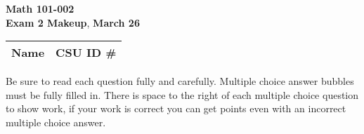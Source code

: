 \documentclass[12pt]{exam}
\newcommand{\class}{Math 101-002} %
\newcommand{\examnum}{Exam 2 Makeup} %
\newcommand{\examdate}{March 26} %
\begin{document}
\pagestyle{plain}
\thispagestyle{empty}

\noindent
\textbf{\class}\\
\textbf{\examnum}, \textbf{\examdate} \\



\setlength{\tabcolsep}{3.5cm} %
\renewcommand{\arraystretch}{1.5}
\setlength\extrarowheight{1cm}
\begin{tabular}{ |c|c| } 
 \hline
 Name   & CSU ID \#  \\ 
 \hline
\end{tabular}
\vspace{10pt}

Be sure to read each question fully and carefully. Multiple choice answer bubbles must be fully filled in.  There is space to the right of each multiple choice question to show work, if your work is correct you can get points even with an incorrect multiple choice answer.  


\iffalse

    \foreach \s in {1,...,5}{
          \choice $P_\s$ has no power 
     }%
\fi
\end{document}
